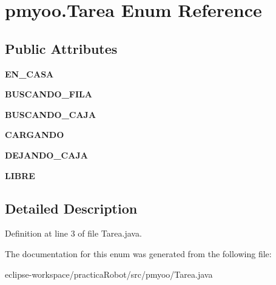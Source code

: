 \hypertarget{enumpmyoo_1_1_tarea}{}\section{pmyoo.\+Tarea Enum Reference}
\label{enumpmyoo_1_1_tarea}
\subsection*{Public Attributes}
\begin{DoxyCompactItemize}
\item 
\mbox{\label{enumpmyoo_1_1_tarea_a7f56ffe506b453b5ef9b7b1881478ee8}} 
{\bfseries E\+N\+\_\+\+C\+A\+SA}
\item 
\mbox{\label{enumpmyoo_1_1_tarea_a3906a58969e98a1ae766e088685a6876}} 
{\bfseries B\+U\+S\+C\+A\+N\+D\+O\+\_\+\+F\+I\+LA}
\item 
\mbox{\label{enumpmyoo_1_1_tarea_a43e19ddc64f0744cdbb06bb5dbee1524}} 
{\bfseries B\+U\+S\+C\+A\+N\+D\+O\+\_\+\+C\+A\+JA}
\item 
\mbox{\label{enumpmyoo_1_1_tarea_a86fa0c0afd0dc27778dfdae62b31d772}} 
{\bfseries C\+A\+R\+G\+A\+N\+DO}
\item 
\mbox{\label{enumpmyoo_1_1_tarea_a76e08179bed691ab3015d43e2521dd13}} 
{\bfseries D\+E\+J\+A\+N\+D\+O\+\_\+\+C\+A\+JA}
\item 
\mbox{\label{enumpmyoo_1_1_tarea_a583f8c5567bf1e805a60562d3b186a82}} 
{\bfseries L\+I\+B\+RE}
\end{DoxyCompactItemize}


\subsection{Detailed Description}


Definition at line 3 of file Tarea.\+java.



The documentation for this enum was generated from the following file\+:\begin{DoxyCompactItemize}
\item 
eclipse-\/workspace/practica\+Robot/src/pmyoo/Tarea.\+java\end{DoxyCompactItemize}
